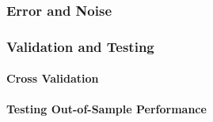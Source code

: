 \subsubsection{Error and Noise}
\label{ssub:ErrorandNoise}
\subsubsection{Validation and Testing}
\label{ssub:ValidationandTesting}
\paragraph{Cross Validation}
\label{par:CrossValidation}
\paragraph{Testing Out-of-Sample Performance}
\label{par:Testing Out-of-Sample Performance}


